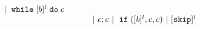 \[\begin{array}{llll}
~|~ {\ewhile [ \bexpr ]^{l} \edo {c} }
 \\
 &&&
~|~ {c};{c} 
~|~ \eif([\bexpr]{}^l , {c}, {c}) 
~|~ [\eskip]^l 
%
%
\end{array}
\]

